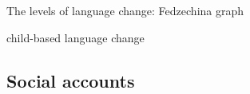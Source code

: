 


The levels of language change: Fedzechina graph

child-based language change~\citep[p.109]{Croft2006}

\subsection{Social accounts}

